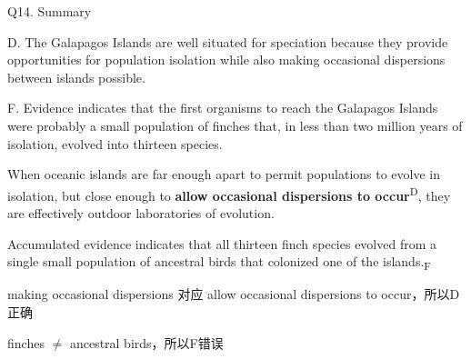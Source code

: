 \begin{blk}
    \begin{qst}
        Q14. Summary
    \end{qst}

    \begin{chc}
        D. The Galapagos Islands are well situated for speciation because they provide opportunities for population isolation while also making occasional dispersions between islands possible.

        F. Evidence indicates that the first organisms to reach the Galapagos Islands were probably a small population of finches that, in less than two million years of isolation, evolved into thirteen species.
    \end{chc}

    \begin{psgq}
        When oceanic islands are far enough apart to permit populations to evolve in isolation, but close enough to \textbf{allow occasional dispersions to occur}\textsuperscript{D}, they are effectively outdoor laboratories of evolution.

        Accumulated evidence indicates that all thirteen finch species evolved from a single small population of ancestral birds that colonized one of the islands.\textsubscript{F}
    \end{psgq}

    \begin{nlz}
        making occasional dispersions 对应 allow occasional dispersions to occur，所以D正确

        finches $\neq $ ancestral birds，所以F错误
    \end{nlz}
\end{blk}
